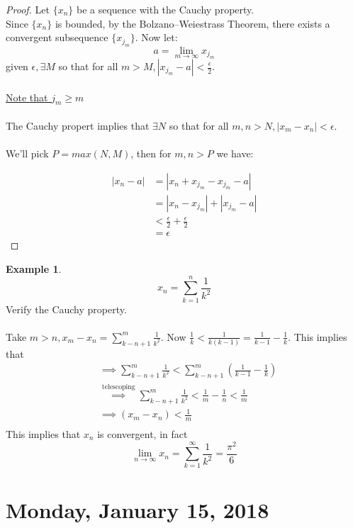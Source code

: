 \documentclass[12pt]{article}
\theoremstyle{plain}
\theoremstyle{definition}
\newtheorem{example}[theorem]{Example}
\begin{document}
\begin{proof}
    Let $\{ x_n \}$ be a sequence with the Cauchy property.\\
    Since $\{ x_n \}$ is bounded, by the Bolzano--Weiestrass Theorem, there exists a convergent subsequence $\{ x_{j_m} \}$. Now let:
    $$a = \lim_{m\to\infty} x_{j_m}$$
    given $\epsilon, \exists M$ so that for all $m > M, |x_{j_m} - a| < \frac{\epsilon}{2}$.\\
    \\
    \underline{Note that $j_m \geq m$}\\
    \\
    The Cauchy propert implies that $\exists N$ so that for all $m,n > N, |x_m - x_n| < \epsilon$.\\
    \\
    We'll pick $P = max(N,M)$, then for $m,n > P$ we have:
    
    \begin{align*}
        |x_n - a| &= |x_n + x_{j_m} - x_{j_m} - a|\\
        &= |x_n - x_{j_m}| + |x_{j_m} - a|\\
        &< \frac{\epsilon}{2} + \frac{\epsilon}{2}\\
        &= \epsilon
    \end{align*}
\end{proof}

\begin{example}
    $$x_n = \sum^n_{k=1} \frac{1}{k^2}$$
    Verify the Cauchy property.\\
    \\
    Take $m>n, x_m - x_n = \sum^m_{k-n+1} \frac{1}{k^2}$. Now $\frac{1}{k} < \frac{1}{k(k-1)} = \frac{1}{k-1} - \frac{1}{k}$. This implies that
    \begin{align*}
        &\implies \sum^m_{k-n+1} \frac{1}{k^2} < \sum^m_{k-n+1} (\frac{1}{k-1} - \frac{1}{k})\\
        &\overset{\text{telescoping}}{\implies} \sum^m_{k-n+1} \frac{1}{k^2} < \frac{1}{m} - \frac{1}{n} < \frac{1}{m}\\
        &\implies (x_m - x_n) < \frac{1}{m}\\
    \end{align*}
    This implies that $x_n$ is convergent, in fact
    $$\lim_{n\to\infty} x_n = \sum^\infty_{k=1} \frac{1}{k^2} = \frac{\pi^2}{6}$$
\end{example}

\newpage

\section{Monday, January 15, 2018}
\end{document}
